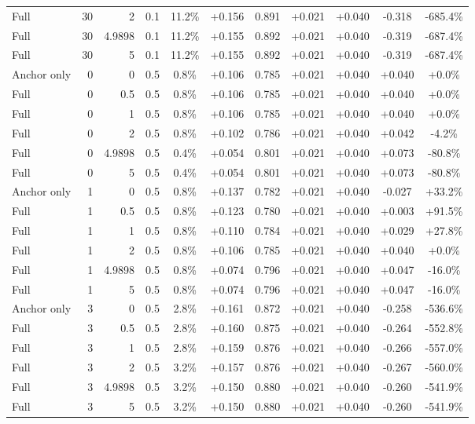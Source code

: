 \begin{table}[htbp]
\begin{tabular}{lrrrccccccc}
Full & 30 & 2 & 0.1 & 11.2\% & +0.156 & 0.891 & +0.021 & +0.040 & -0.318 & -685.4\% \\
Full & 30 & 4.9898 & 0.1 & 11.2\% & +0.155 & 0.892 & +0.021 & +0.040 & -0.319 & -687.4\% \\
Full & 30 & 5 & 0.1 & 11.2\% & +0.155 & 0.892 & +0.021 & +0.040 & -0.319 & -687.4\% \\
Anchor only & 0 & 0 & 0.5 & 0.8\% & +0.106 & 0.785 & +0.021 & +0.040 & +0.040 & +0.0\% \\
Full & 0 & 0.5 & 0.5 & 0.8\% & +0.106 & 0.785 & +0.021 & +0.040 & +0.040 & +0.0\% \\
Full & 0 & 1 & 0.5 & 0.8\% & +0.106 & 0.785 & +0.021 & +0.040 & +0.040 & +0.0\% \\
Full & 0 & 2 & 0.5 & 0.8\% & +0.102 & 0.786 & +0.021 & +0.040 & +0.042 & -4.2\% \\
Full & 0 & 4.9898 & 0.5 & 0.4\% & +0.054 & 0.801 & +0.021 & +0.040 & +0.073 & -80.8\% \\
Full & 0 & 5 & 0.5 & 0.4\% & +0.054 & 0.801 & +0.021 & +0.040 & +0.073 & -80.8\% \\
Anchor only & 1 & 0 & 0.5 & 0.8\% & +0.137 & 0.782 & +0.021 & +0.040 & -0.027 & +33.2\% \\
Full & 1 & 0.5 & 0.5 & 0.8\% & +0.123 & 0.780 & +0.021 & +0.040 & +0.003 & +91.5\% \\
Full & 1 & 1 & 0.5 & 0.8\% & +0.110 & 0.784 & +0.021 & +0.040 & +0.029 & +27.8\% \\
Full & 1 & 2 & 0.5 & 0.8\% & +0.106 & 0.785 & +0.021 & +0.040 & +0.040 & +0.0\% \\
Full & 1 & 4.9898 & 0.5 & 0.8\% & +0.074 & 0.796 & +0.021 & +0.040 & +0.047 & -16.0\% \\
Full & 1 & 5 & 0.5 & 0.8\% & +0.074 & 0.796 & +0.021 & +0.040 & +0.047 & -16.0\% \\
Anchor only & 3 & 0 & 0.5 & 2.8\% & +0.161 & 0.872 & +0.021 & +0.040 & -0.258 & -536.6\% \\
Full & 3 & 0.5 & 0.5 & 2.8\% & +0.160 & 0.875 & +0.021 & +0.040 & -0.264 & -552.8\% \\
Full & 3 & 1 & 0.5 & 2.8\% & +0.159 & 0.876 & +0.021 & +0.040 & -0.266 & -557.0\% \\
Full & 3 & 2 & 0.5 & 3.2\% & +0.157 & 0.876 & +0.021 & +0.040 & -0.267 & -560.0\% \\
Full & 3 & 4.9898 & 0.5 & 3.2\% & +0.150 & 0.880 & +0.021 & +0.040 & -0.260 & -541.9\% \\
Full & 3 & 5 & 0.5 & 3.2\% & +0.150 & 0.880 & +0.021 & +0.040 & -0.260 & -541.9\% \\

\end{tabular}
\end{table}
